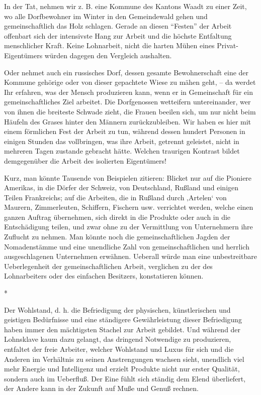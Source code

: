 \documentclass{scrbook}
\begin{document}
In der Tat, nehmen wir z. B. eine Kommune des Kantons Waadt zu einer Zeit, wo alle Dorfbewohner im Winter in den Gemeindewald gehen und gemeinschaftlich das Holz schlagen. Gerade an diesen ``Festen'' der Arbeit offenbart sich der intensivste Hang zur Arbeit und die höchste Entfaltung menschlicher Kraft. Keine Lohnarbeit, nicht die harten Mühen eines Privat-Eigentümers würden dagegen den Vergleich aushalten.

Oder nehmet auch ein russisches Dorf, dessen gesamte Bewohnerschaft eine der Kommune gehörige oder von dieser gepachtete Wiese zu mähen geht, – da werdet Ihr erfahren, was der Mensch produzieren kann, wenn er in Gemeinschaft für ein gemeinschaftliches Ziel arbeitet. Die Dorfgenossen wetteifern untereinander, wer von ihnen die breiteste Schwade zieht, die Frauen beeilen sich, um nur nicht beim Häufeln des Grases hinter den Männern zurückzubleiben. Wir haben es hier mit einem förmlichen Fest der Arbeit zu tun, während dessen hundert Personen in einigen Stunden das vollbringen, was ihre Arbeit, getrennt geleistet, nicht in mehreren Tagen zustande gebracht hätte. Welchen traurigen Kontrast bildet demgegenüber die Arbeit des isolierten Eigentümers!

Kurz, man könnte Tausende von Beispielen zitieren: Blicket nur auf die Pioniere Amerikas, in die Dörfer der Schweiz, von Deutschland, Rußland und einigen Teilen Frankreichs; auf die Arbeiten, die in Rußland durch ‚Artelen‘ von Maurern, Zimmerleuten, Schiffern, Fischern usw. verrichtet werden, welche einen ganzen Auftrag übernehmen, sich direkt in die Produkte oder auch in die Entschädigung teilen, und zwar ohne zu der Vermittlung von Unternehmern ihre Zuflucht zu nehmen. Man könnte noch die gemeinschaftlichen Jagden der Nomadenstämme und eine unendliche Zahl von gemeinschaftlichen und herrlich ausgeschlagenen Unternehmen erwähnen. Ueberall würde man eine unbestreitbare Ueberlegenheit der gemeinschaftlichen Arbeit, verglichen zu der des Lohnarbeiters oder des einfachen Besitzers, konstatieren können.

\begin{center}*\end{center}

Der Wohlstand, d. h. die Befriedigung der physischen, künstlerischen und geistigen Bedürfnisse und eine ständigere Gewährleistung dieser Befriedigung haben immer den mächtigsten Stachel zur Arbeit gebildet. Und während der Lohnsklave kaum dazu gelangt, das dringend Notwendige zu produzieren, entfaltet der freie Arbeiter, welcher Wohlstand und Luxus für sich und die Anderen im Verhältnis zu seinen Anstrengungen wachsen sieht, unendlich viel mehr Energie und Intelligenz und erzielt Produkte nicht nur erster Qualität, sondern auch im Ueberfluß. Der Eine fühlt sich ständig dem Elend überliefert, der Andere kann in der Zukunft auf Muße und Genuß rechnen.
\end{document}

